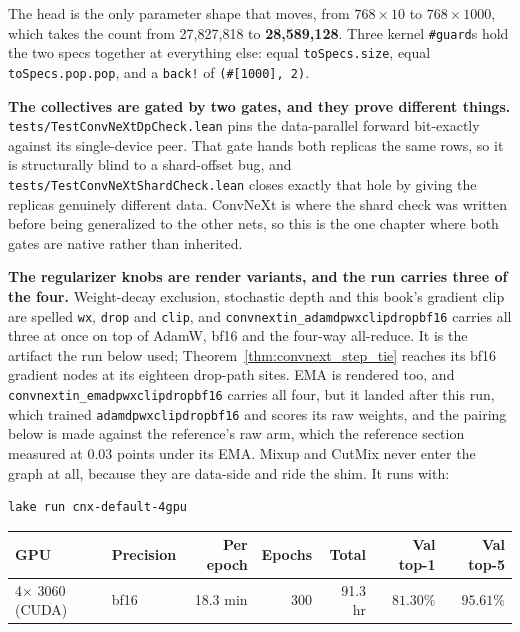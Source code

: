\noindent The head is the only parameter shape that moves, from
$768 \times 10$ to $768 \times 1000$, which takes the count from
27,827,818 to \textbf{28,589,128}. Three kernel \texttt{\#guard}s hold
the two specs together at everything else: equal
\texttt{toSpecs.size}, equal \texttt{toSpecs.pop.pop}, and a
\texttt{back!} of \texttt{(\#[1000], 2)}.

\medskip\noindent\textbf{The collectives are gated by two gates, and
they prove different things.}
\texttt{tests/TestConvNeXtDpCheck.lean} pins the data-parallel forward
bit-exactly against its single-device peer. That gate hands both
replicas the same rows, so it is structurally blind to a shard-offset
bug, and \texttt{tests/TestConvNeXtShardCheck.lean} closes exactly that
hole by giving the replicas genuinely different data. ConvNeXt is where
the shard check was written before being generalized to the other nets,
so this is the one chapter where both gates are native rather than
inherited.

\medskip\noindent\textbf{The regularizer knobs are render variants, and
the run carries three of the four.} Weight-decay exclusion, stochastic
depth and this book's gradient clip are spelled \texttt{wx},
\texttt{drop} and \texttt{clip}, and
\texttt{convnextin\_\allowbreak adamdpwxclipdropbf16} carries all three at
once on top of AdamW, bf16 and the four-way all-reduce. It is the artifact
the run below used; Theorem~\ref{thm:convnext_step_tie} reaches its bf16
gradient nodes at its eighteen drop-path sites. EMA is rendered too, and
\texttt{convnextin\_emadpwxclipdropbf16} carries all four, but it landed
after this run, which trained \texttt{adamdpwxclipdropbf16} and scores its
raw weights,
and the pairing below is made against the reference's raw arm, which the
reference section measured at $0.03$ points under its EMA. Mixup and
CutMix never enter the graph at all, because they are data-side and ride
the shim. It runs with:

\begin{verbatim}
lake run cnx-default-4gpu
\end{verbatim}

\begin{center}
\begin{tabular}{l l r r r r r}
\hline
GPU & Precision & Per epoch & Epochs & Total & Val top-1 & Val top-5 \\
\hline
4$\times$ 3060 (CUDA) & bf16 & 18.3 min & 300 & 91.3 hr & $\mathbf{81.30\%}$ & $\mathbf{95.61\%}$ \\
\hline
\end{tabular}
\end{center}

